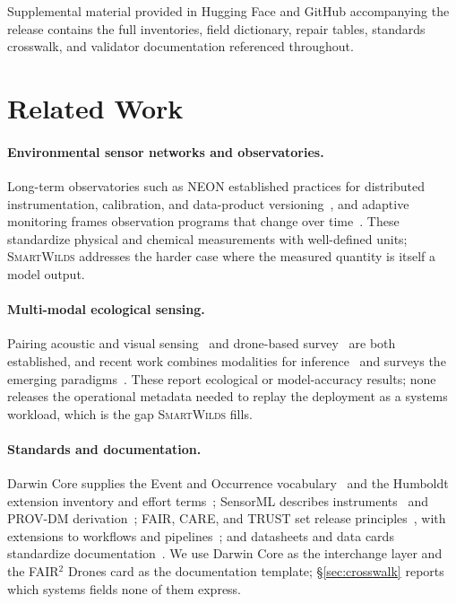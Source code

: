 \documentclass[sigconf]{acmart}
\newcommand{\smartwilds}{\textsc{SmartWilds}\xspace}
\begin{document}
Supplemental material provided in Hugging Face and GitHub accompanying the release contains the full
inventories, field dictionary, repair tables, standards crosswalk, and
validator documentation referenced throughout.


\section{Related Work}
\label{sec:related}

\paragraph{Environmental sensor networks and observatories.}
Long-term observatories such as NEON established practices for
distributed instrumentation, calibration, and data-product
versioning~\cite{metzger2019neon,staccone2021neon}, and adaptive
monitoring frames observation programs that change over
time~\cite{lindenmayer2009adaptive,henrys2024adaptive,jain2004adaptive}.
These standardize physical and chemical measurements with well-defined
units; \smartwilds addresses the harder case where the measured quantity
is itself a model output.

\paragraph{Multi-modal ecological sensing.}
Pairing acoustic and visual
sensing~\cite{buxton2018pairing,Waegele2022Multisensor} and drone-based
survey~\cite{koger2023drones,Koger2026Efficient,Schad2023Drones,Corcoran2021Automated}
are both established, and recent work combines modalities for
inference~\cite{Haucke2025DeepMultimodal,Miao2026Multimodal,Chen2026Snapshots}
and surveys the emerging
paradigms~\cite{lombardo2026paradigms,tuia2022perspectives,Tuia2026Digital,Pollock2025Harnessing,pollock2026roam,pierrat2025proximal}.
These report ecological or model-accuracy results; none releases the
operational metadata needed to replay the deployment as a systems
workload, which is the gap \smartwilds fills.

\paragraph{Standards and documentation.}
Darwin Core supplies the Event and Occurrence
vocabulary~\cite{wieczorek2012darwincore,tdwgDarwinCore} and the
Humboldt extension inventory and effort terms~\cite{tdwgHumboldt};
SensorML describes instruments~\cite{ogcSensorML} and PROV-DM
derivation~\cite{w3cProvDM}; FAIR, CARE, and TRUST set release
principles~\cite{wilkinson2016fair,carroll2020care,lin2020trust}, with
extensions to workflows and
pipelines~\cite{wilkinson2025fairworkflows,mitchell2022fairpipeline,pennington2025pipeline,woodcharlson2026faircope};
and datasheets and data cards standardize
documentation~\cite{gebru2021datasheets,pushkarna2022datacards}. We use
Darwin Core as the interchange layer and the FAIR$^2$ Drones card as the
documentation template; \S\ref{sec:crosswalk} reports which systems
fields none of them express.
\end{document}
